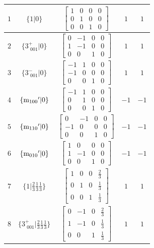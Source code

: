 \documentclass[fleqn,8pt]{jsarticle}
\begin{document}
\begin{longtable}{ccccc}
$ 1 $ & $ \{1|0\} $ & $ \begin{bmatrix} 1 & 0 & 0 & 0 \\ 0 & 1 & 0 & 0 \\ 0 & 0 & 1 & 0 \end{bmatrix} $ & $ 1 $ & $ 1 $ \\ \hline
$ 2 $ & $ \{3^{+}_{\,\,001}|0\} $ & $ \begin{bmatrix} 0 & -1 & 0 & 0 \\ 1 & -1 & 0 & 0 \\ 0 & 0 & 1 & 0 \end{bmatrix} $ & $ 1 $ & $ 1 $ \\ \hline
$ 3 $ & $ \{3^{-}_{\,\,001}|0\} $ & $ \begin{bmatrix} -1 & 1 & 0 & 0 \\ -1 & 0 & 0 & 0 \\ 0 & 0 & 1 & 0 \end{bmatrix} $ & $ 1 $ & $ 1 $ \\ \hline
$ 4 $ & $ \{{\rm m}_{100}{}'|0\} $ & $ \begin{bmatrix} -1 & 1 & 0 & 0 \\ 0 & 1 & 0 & 0 \\ 0 & 0 & 1 & 0 \end{bmatrix} $ & $ -1 $ & $ -1 $ \\ \hline
$ 5 $ & $ \{{\rm m}_{110}{}'|0\} $ & $ \begin{bmatrix} 0 & -1 & 0 & 0 \\ -1 & 0 & 0 & 0 \\ 0 & 0 & 1 & 0 \end{bmatrix} $ & $ -1 $ & $ -1 $ \\ \hline
$ 6 $ & $ \{{\rm m}_{010}{}'|0\} $ & $ \begin{bmatrix} 1 & 0 & 0 & 0 \\ 1 & -1 & 0 & 0 \\ 0 & 0 & 1 & 0 \end{bmatrix} $ & $ -1 $ & $ -1 $ \\ \hline
$ 7 $ & $ \{1|\frac{2}{3} \frac{1}{3} \frac{1}{3}\} $ & $ \begin{bmatrix} 1 & 0 & 0 & \frac{2}{3} \\ 0 & 1 & 0 & \frac{1}{3} \\ 0 & 0 & 1 & \frac{1}{3} \end{bmatrix} $ & $ 1 $ & $ 1 $ \\ \hline
$ 8 $ & $ \{3^{+}_{\,\,001}|\frac{2}{3} \frac{1}{3} \frac{1}{3}\} $ & $ \begin{bmatrix} 0 & -1 & 0 & \frac{2}{3} \\ 1 & -1 & 0 & \frac{1}{3} \\ 0 & 0 & 1 & \frac{1}{3} \end{bmatrix} $ & $ 1 $ & $ 1 $ \\ \hline

\end{longtable}
\end{document}
